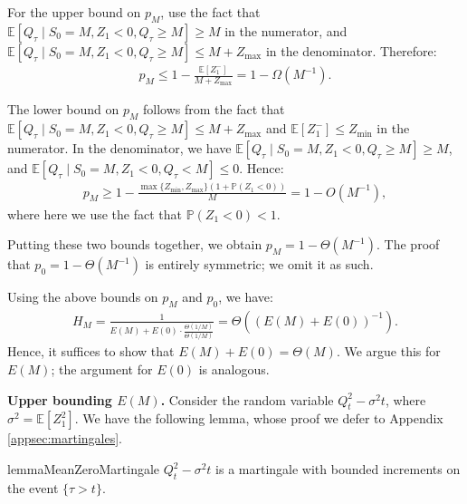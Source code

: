 \documentclass[mnsc,nonblindrev]{informs3}
\newcommand{\E}{\mathbb{E}}
\newcommand{\pr}{\mathbb{P}}
\renewcommand{\Pr}{\pr}
\renewenvironment{proof}[1][Proof]{%
  \par\noindent{\itshape #1.} \ignorespaces
}{%
  \hfill\Halmos\par
}
\begin{document}
\begin{APPENDICES}
\begin{proof}

For the upper bound on $p_M$, use the fact that
$\E[Q_\tau \mid S_0 = M, Z_1 < 0, Q_\tau \geq M] \geq M$
in the numerator, and $\E[Q_\tau \mid S_0 = M, Z_1 < 0, Q_\tau \geq M] \leq M+Z_{\max}$ in the denominator. Therefore:
\begin{align*}
p_M \leq 1-\frac{\E[Z_1^-]}{M+Z_{\max}} = 1-\Omega(M^{-1}).
\end{align*}

The lower bound on $p_M$ follows from the fact that $\E[Q_\tau \mid S_0 = M, Z_1 < 0, Q_\tau \geq M] \leq M+Z_{\max}$ and $\E[Z_1^-] \leq {Z_{\min}}$ in the numerator. In the denominator, we have $\E[Q_\tau \mid S_0 = M, Z_1 < 0, Q_\tau \geq M] \geq M$, and $\E[Q_\tau \mid S_0 = M, Z_1 < 0, Q_\tau < M] \leq 0$. Hence:
\begin{align*}
p_M \geq 1-\frac{{\max\{Z_{\min}, Z_{\max}\}}\left(1+\Pr(Z_1 < 0)\right)}{M} = 1-O(M^{-1}),
\end{align*}
where here we use the fact that $\Pr(Z_1 < 0) < 1$.

Putting these two bounds together, we obtain $p_M = 1-\Theta(M^{-1})$. The proof that $p_0 = 1-\Theta(M^{-1})$ is entirely symmetric; we omit it as such.




Using the above bounds on $p_M$ and $p_0$, we have:
\begin{align*}
H_M = \frac{1}{E(M) + E(0)\cdot \frac{\Theta(1/M)}{\Theta(1/M)}} = \Theta\left(\left(E(M)+E(0)\right)^{-1}\right).
\end{align*}
Hence, it suffices to show that $E(M) + E(0) = \Theta(M)$. We argue this for $E(M)$; the argument for $E(0)$ is analogous.

\medskip

\textbf{Upper bounding $E(M)$.} Consider the random variable $Q_t^2-\sigma^2t$, where $\sigma^2 = \E[Z_1^2]$. We have the following lemma, whose proof we defer to Appendix \ref{appsec:martingales}.

\begin{restatable}{lemma}{MeanZeroMartingale} \label{lem:Mean_0_case_marginales}
    $Q_t^2-\sigma^2 t$ is a martingale with bounded increments on the event $\{\tau > t\}$.
\end{restatable}


\end{proof}
\end{APPENDICES}
\end{document}

